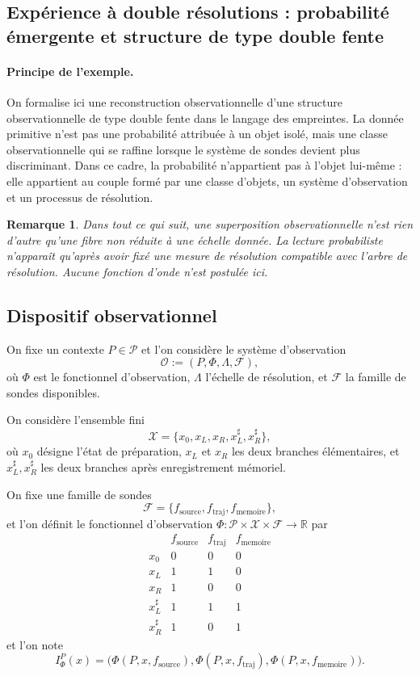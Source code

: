 \documentclass[11pt,a4paper]{article}
\newtheorem{remark}{Remarque}
\begin{document}
\begin{appendices}
\subsection*{Expérience à double résolutions : probabilité émergente et structure de type double fente}

\paragraph{Principe de l'exemple.}
On formalise ici une reconstruction observationnelle d'une structure observationnelle de type double fente dans le langage des empreintes. La donnée primitive n'est pas une probabilité attribuée à un objet isolé, mais une classe observationnelle qui se raffine lorsque le système de sondes devient plus discriminant. Dans ce cadre, la probabilité n'appartient pas à l'objet lui-même : elle appartient au couple formé par une classe d'objets, un système d'observation et un processus de résolution.

\begin{remark}
Dans tout ce qui suit, une superposition observationnelle n'est rien d'autre qu'une fibre non réduite à une échelle donnée. La lecture probabiliste n'apparaît qu'après avoir fixé une mesure de résolution compatible avec l'arbre de résolution. Aucune fonction d'onde n'est postulée ici.
\end{remark}

\subsection*{Dispositif observationnel}

On fixe un contexte \(P\in\mathcal P\) et l'on considère le système d'observation
\[
\mathcal O:=(P,\Phi,\Lambda,\mathcal F),
\]
où \(\Phi\) est le fonctionnel d'observation, \(\Lambda\) l'échelle de résolution, et \(\mathcal F\) la famille de sondes disponibles.

On considère l'ensemble fini
\[
\mathcal X=\{x_0,x_L,x_R,x_L^\sharp,x_R^\sharp\},
\]
où \(x_0\) désigne l'état de préparation, \(x_L\) et \(x_R\) les deux branches élémentaires, et \(x_L^\sharp,x_R^\sharp\) les deux branches après enregistrement mémoriel.

On fixe une famille de sondes
\[
\mathcal F=\{f_{\mathrm{source}},f_{\mathrm{traj}},f_{\mathrm{memoire}}\},
\]
et l'on définit le fonctionnel d'observation \(\Phi:\mathcal P\times\mathcal X\times\mathcal F\to\mathbb R\) par
\[
\begin{array}{c|ccc}
& f_{\mathrm{source}} & f_{\mathrm{traj}} & f_{\mathrm{memoire}}\\ \hline
x_0 & 0 & 0 & 0\\
x_L & 1 & 1 & 0\\
x_R & 1 & 0 & 0\\
x_L^\sharp & 1 & 1 & 1\\
x_R^\sharp & 1 & 0 & 1
\end{array}
\]
et l'on note
\[
I_\Phi^P(x)=\bigl(\Phi(P,x,f_{\mathrm{source}}),\Phi(P,x,f_{\mathrm{traj}}),\Phi(P,x,f_{\mathrm{memoire}})\bigr).
\]


\end{appendices}
\end{document}
